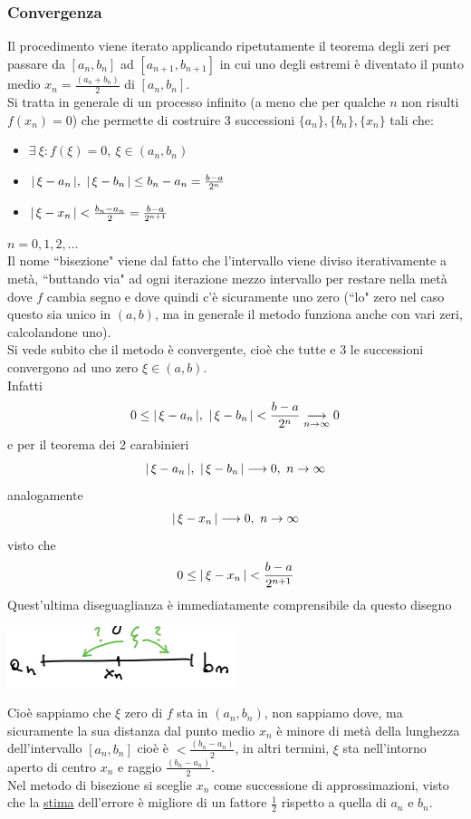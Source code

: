 \subsubsection{Convergenza}
Il procedimento viene iterato applicando ripetutamente il teorema degli zeri per passare da $[a_n,b_n]$ ad $[a_{n+1},b_{n+1}]$ in cui uno degli estremi è diventato il punto medio $x_n=\frac{(a_n+b_n)}{2}$ di $[a_n,b_n]$.\\
Si tratta in generale di un processo infinito (a meno che per qualche $n$ non risulti $f(x_n)=0$) che permette di costruire 3 successioni $\{ a_n \} , \{ b_n \} , \{ x_n \} $ tali che:
\begin{itemize}
    \item $\exists\ \xi : f(\xi)=0, \ \xi \in (a_n,b_n)$
    \item $\lvert\,\xi - a_n\,\rvert, \ \lvert\,\xi - b_n\,\rvert \le b_n-a_n=\frac{b-a}{2^n}$
    \item $\lvert\,\xi - x_n\,\rvert < \frac{b_n - a_n}{2} = \frac{b-a}{2^{n+1}}$
\end{itemize}
$n=0,1,2,\dots$ \\
Il nome ``bisezione" viene dal fatto che l'intervallo viene diviso iterativamente a metà, ``buttando via" ad ogni iterazione mezzo intervallo per restare nella metà dove $f$ cambia segno e dove quindi c'è sicuramente uno zero (``lo" zero nel caso questo sia unico in $(a,b)$, ma in generale il metodo funziona anche con vari zeri, calcolandone uno). \\
Si vede subito che il metodo è convergente, cioè che tutte e 3 le successioni convergono ad uno zero $\xi \in (a,b)$.\\
Infatti
\[0 \le \abs{\,\xi - a_n\,}, \ \abs{\,\xi - b_n\,} < \frac{b-a}{2^n}\underset{n\to \infty}{\longrightarrow}  0\]
e per il teorema dei 2 carabinieri
\[\lvert\,\xi - a_n\,\rvert, \ \lvert\,\xi - b_n\,\rvert \longrightarrow 0, \ n \rightarrow \infty\]
analogamente
\[\lvert\,\xi - x_n\,\rvert \longrightarrow 0, \ n \rightarrow \infty\]
visto che 
\[0 \le \lvert\,\xi - x_n\,\rvert < \frac{b-a}{2^{n+1}}\]
Quest'ultima diseguaglianza è immediatamente comprensibile da questo disegno
\begin{center}
    \includegraphics[width=0.5\textwidth]{foto/6}\par
\end{center}
Cioè sappiamo che $\xi$ zero di $f$ sta in $(a_n, b_n)$, non sappiamo dove, ma sicuramente la sua distanza dal punto medio $x_n$ è minore di metà della lunghezza dell'intervallo $[a_n, b_n]$ cioè è $< \frac{(b_n - a_n)}{2}$, in altri termini, $\xi$ sta nell'intorno aperto di centro $x_n$ e raggio $\frac{(b_n - a_n)}{2}$. \\
Nel metodo di bisezione si sceglie $x_n$ come successione di approssimazioni, visto che la \uline{stima} dell'errore è migliore di un fattore $\frac{1}{2}$ rispetto a quella di $a_n$ e $b_n$.

